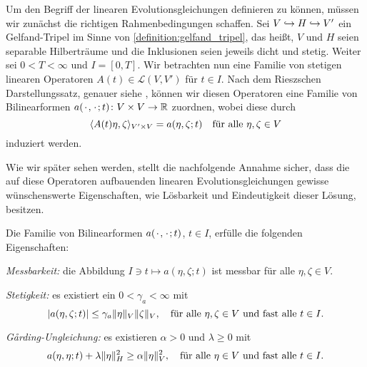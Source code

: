 Um den Begriff der linearen Evolutionsgleichungen definieren zu können, müssen wir zunächst die richtigen Rahmenbedingungen schaffen.
Sei $V \denseinclusion H \denseinclusion V'$ ein Gelfand-Tripel im Sinne von \cref{definition:gelfand_tripel}, das heißt, $V$ und $H$ seien separable Hilberträume und die Inklusionen seien jeweils dicht und stetig.
Weiter sei $0 < T < \infty$ und $I = [0, T]$.
Wir betrachten nun eine Familie von stetigen linearen Operatoren $A(t) \in \mathcal L(V, V')$ für $t \in I$.
Nach dem Rieszschen Darstellungssatz, genauer siehe \cite[Theorem \S{}22.1]{Halmos:1957vd}, können wir diesen Operatoren eine Familie von Bilinearformen $a(\blank, \blank; t) \colon V \times V \to \mathbb{R}$ zuordnen, wobei diese durch
\begin{equation}
    \skp{A(t)\eta}{\zeta}{V' \times V} = a(\eta, \zeta; t) \quad \fa \eta, \zeta \in V
\end{equation}
induziert werden.

Wie wir später sehen werden, stellt die nachfolgende Annahme sicher, dass die auf diese Operatoren aufbauenden linearen Evolutionsgleichungen gewisse wünschenswerte Eigenschaften, wie Lösbarkeit und Eindeutigkeit dieser Lösung, besitzen.

\begin{Annahme}
\label{ann:gl:le:bilinearform_eigenschaften}
    Die Familie von Bilinearformen $a(\blank, \blank; t)$, $t \in I$, erfülle die folgenden Eigenschaften:
    \leavevmode
    \begin{thmenumerate}
        \item \emph{Messbarkeit:} die Abbildung $I \ni t \mapsto a(\eta, \zeta; t)$ ist messbar für alle $\eta, \zeta \in V$.
        \item \emph{Stetigkeit:}
        es existiert ein $0 < \gamma_{a} < \infty$ mit
        \begin{equation}
            \label{eq:gl:le:bilinearform_stetig}
            \abs{a(\eta, \zeta; t)} \leq \gamma_{a} \norm{\eta}_{V} \norm{\zeta}_{V}, \quad \fa \eta, \zeta \in V \text{ und fast alle } t \in I.
        \end{equation}
        \item \emph{G\r{a}rding-Ungleichung:}
        es existieren $\alpha > 0$ und $\lambda \geq 0$ mit
        \begin{equation}
            \label{eq:gl:le:bilinearform_garding}
            a(\eta, \eta; t) + \lambda \norm{\eta}_{H}^{2} \geq \alpha \norm{\eta}_{V}^{2}, \quad \fa \eta \in V \text{ und fast alle } t \in I.
        \end{equation}
    \end{thmenumerate}
\end{Annahme}

